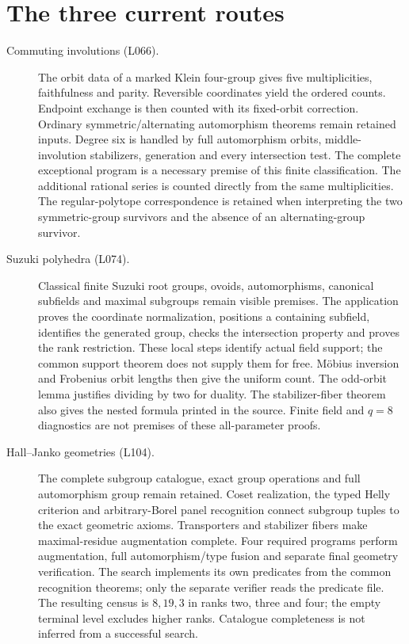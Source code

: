 \documentclass[a4paper,11pt]{article}
\begin{document}
\section*{The three current routes}
\begin{description}
\item[Commuting involutions (L066).]
The orbit data of a marked Klein four-group gives five multiplicities,
faithfulness and parity. Reversible coordinates yield the ordered counts.
Endpoint exchange is then counted with its fixed-orbit correction. Ordinary
symmetric/alternating automorphism theorems remain retained inputs.
Degree six is handled by full automorphism orbits, middle-involution
stabilizers, generation and every intersection test. The complete exceptional
program is a necessary premise of this finite classification. The additional
rational series is counted directly from the same multiplicities. The
regular-polytope correspondence is retained when interpreting the two
symmetric-group survivors and the absence of an alternating-group survivor.

\item[Suzuki polyhedra (L074).]
Classical finite Suzuki root groups, ovoids, automorphisms, canonical
subfields and maximal subgroups remain visible premises. The application
proves the coordinate normalization, positions a containing subfield,
identifies the generated group, checks the intersection property and proves
the rank restriction. These local steps identify actual field support;
the common support theorem does not supply them for free. Möbius inversion
and Frobenius orbit lengths then give the uniform count. The odd-orbit
lemma justifies dividing by two for duality. The stabilizer-fiber theorem
also gives the nested formula printed in the source. Finite field and
$q=8$ diagnostics are not premises of these all-parameter proofs.

\item[Hall--Janko geometries (L104).]
The complete subgroup catalogue, exact group operations and full
automorphism group remain retained. Coset realization, the typed Helly
criterion and arbitrary-Borel panel recognition connect subgroup tuples
to the exact geometric axioms. Transporters and stabilizer fibers make
maximal-residue augmentation complete. Four required programs perform
augmentation, full automorphism/type fusion and separate final geometry
verification. The search implements its own predicates from the common
recognition theorems; only the separate verifier reads the predicate file. The resulting census is
$8,19,3$ in ranks two, three and four; the empty terminal level excludes
higher ranks. Catalogue completeness is not inferred from a successful
search.
\end{description}
\end{document}
